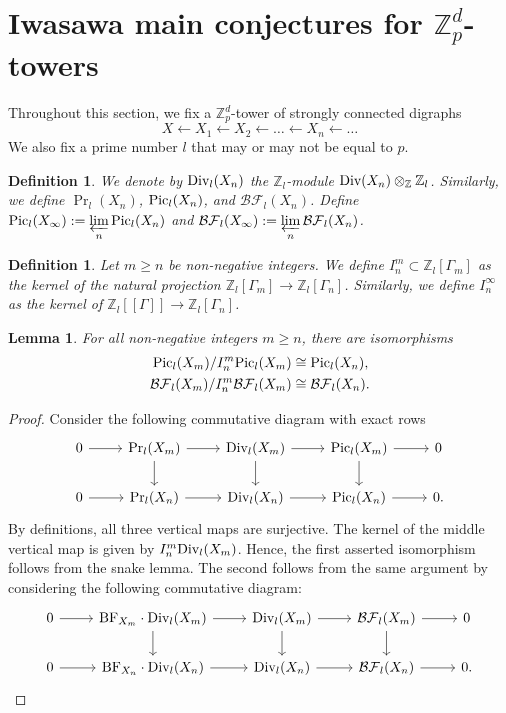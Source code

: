 \documentclass[11pt]{amsart}
\newtheorem{lemma}[theorem]{Lemma}
\newtheorem{defn}[theorem]{Definition}
\numberwithin{equation}{section}
\theoremstyle{remark}
\newcommand{\?}{\stackrel{?}{=}}
\newcommand{\Z}{\mathbb{Z}}
\newcommand{\Div}{\textup{Div}}
\newcommand{\BF}{\mathcal{BF}}
\newcommand{\pic}{\textup{Pic}}
\begin{document}
\section{Iwasawa main conjectures for $\Z_p^d$-towers}
Throughout this section, we fix a $\Z^d_p$-tower of strongly connected digraphs
\[X\leftarrow X_1\leftarrow X_2\leftarrow \dots \leftarrow X_n\leftarrow \dots\]
 We also fix a prime number $l$ that may or may not be equal to $p$.


\begin{defn}
We denote by $\Div_l(X_n)$ the $\Z_l$-module $\textup{Div}(X_n)\otimes_\Z \Z_l$. Similarly, we define $\Pr_l(X_n)$, $\pic_l(X_n)$, and $\BF_l(X_n)$.  Define $\pic_l(X_\infty):=\displaystyle\varprojlim_n \pic_l(X_n)$ and $\BF_l(X_\infty):=\displaystyle\varprojlim_n\BF_l(X_n)$.
\end{defn}


\begin{defn}
    Let $m\ge n$ be non-negative integers. We define $I^m_n\subset \Z_l[\Gamma_m]$ as the kernel of the natural projection $\Z_l[\Gamma_m]\to \Z_l[\Gamma_n]$. Similarly, we define $I^\infty_n$ as the kernel of $\Z_l[[\Gamma]]\to \Z_l[\Gamma_n]$. %
\end{defn}
\begin{lemma}\label{lem:control}
For all non-negative integers $m\ge n$, there are isomorphisms
    \begin{align*}
        \pic_l(X_m)/I_n^m\pic_l(X_m)&\cong \pic_l(X_n),\\
\BF_l(X_m)/I_n^m\BF_l(X_m)&\cong \BF_l(X_n).
    \end{align*}
\end{lemma}
\begin{proof}
    Consider the following commutative diagram with exact rows
    \[\begin{tikzcd}
        0\arrow[r] &\Pr_l(X_m)\arrow[r]\arrow[d]&\Div_l(X_m)\arrow[d]\arrow[r]&\textup{Pic}_l(X_m)\arrow[d]\arrow[r]&0\\
         0\arrow[r] &\Pr_l(X_n)\arrow[r]&\Div_l(X_n)\arrow[r]&\textup{Pic}_l(X_n)\arrow[r]&0.
    \end{tikzcd}\]
    By definitions, all three vertical maps are surjective. The kernel of the middle vertical map is given by $I_n^m\Div_l(X_m)$. Hence, the first asserted isomorphism follows from the snake lemma. The second follows from the same argument by considering the following commutative diagram:
    \[\begin{tikzcd}
        0\arrow[r] &\mathrm{BF}_{X_m}\cdot\Div_l(X_m)\arrow[r]\arrow[d]&\Div_l(X_m)\arrow[d]\arrow[r]&\BF_l(X_m)\arrow[d]\arrow[r]&0\\
         0\arrow[r] &\mathrm{BF}_{X_n}\cdot\Div_l(X_n)\arrow[r]&\Div_l(X_n)\arrow[r]&\BF_l(X_n)\arrow[r]&0.
    \end{tikzcd}\]    
\end{proof}
\end{document}
